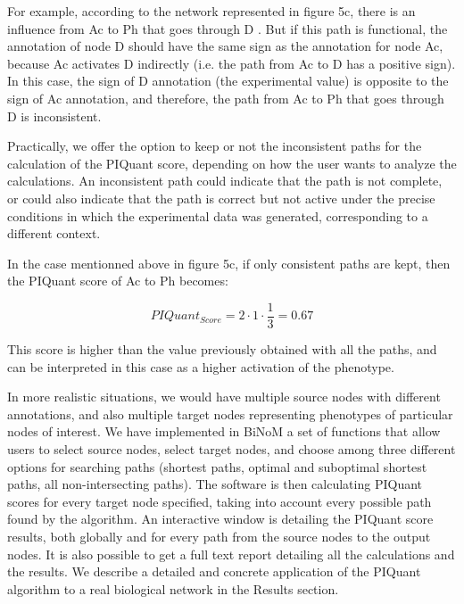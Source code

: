 \documentclass[10pt]{bmc_article}
\newenvironment{bmcformat}{\baselineskip20pt\sloppy\setboolean{publ}{false}}{\baselineskip20pt\sloppy}
\begin{document}
\begin{bmcformat}
For example, according to the network represented in figure 5c, there is an influence from Ac to Ph
that goes through D . But if this path
is functional, the annotation of node D should have the same sign as the annotation for node Ac, because
Ac activates D indirectly (i.e. the path from Ac to D has a positive sign). In this case, the sign of D annotation (the experimental value) is opposite to
the sign of Ac annotation, and therefore, the path from Ac to Ph that goes through D is inconsistent.

Practically, we offer the option to
keep or not the inconsistent paths for the calculation of the PIQuant score,
depending on how the user wants to analyze the calculations. An inconsistent
path could indicate that the path is not complete, or could also indicate that
the path is correct but not active under the precise conditions in which the
experimental data was generated, corresponding to a different context.

In the case mentionned above in figure 5c, if only consistent paths are kept, then the PIQuant score of Ac to Ph
becomes:

$$
 PIQuant_{Score} = 2 \cdot 1 \cdot \frac{1}{3} = 0.67
$$

This score is higher than the value previously obtained with all the paths, and can be interpreted in this case as a higher activation of the phenotype.

In more realistic situations, we would have multiple source nodes with different
 annotations, and also multiple target nodes representing phenotypes of
particular nodes of interest. We have implemented in BiNoM a set of functions
that allow users to select source nodes, select target nodes, and choose among
three different options for searching paths (shortest paths, optimal and
suboptimal shortest paths, all non-intersecting paths). The software is then
calculating PIQuant scores for every target node specified, taking into account
every possible path found by the algorithm. An interactive window is detailing
the PIQuant score results, both globally and for every path from the source
nodes to the output nodes. It is also possible to get a full text report
detailing all the calculations and the results. We describe a detailed
and concrete application of the PIQuant algorithm to a real biological network
in the Results section.


\end{bmcformat}
\end{document}
